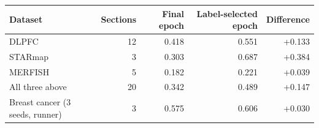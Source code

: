 \footnotesize
\begin{tabular}{lrrrr}
\toprule
Dataset & Sections & Final epoch & Label-selected epoch & Difference \\
\midrule
DLPFC & 12 & 0.418 & 0.551 & +0.133 \\
STARmap & 3 & 0.303 & 0.687 & +0.384 \\
MERFISH & 5 & 0.182 & 0.221 & +0.039 \\
All three above & 20 & 0.342 & 0.489 & +0.147 \\
Breast cancer (3 seeds, runner) & 3 & 0.575 & 0.606 & +0.030 \\
\bottomrule
\end{tabular}
